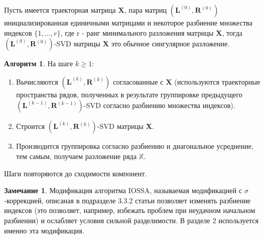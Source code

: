 \documentclass[specialist,
               substylefile = spbu_report.rtx,
               subf,href,colorlinks=true, 12pt]{disser}
\theoremstyle{definition}
\newtheorem{algorithm}{Алгоритм}
\newtheorem{remark}{Замечание}
\begin{document}
    Пусть имеется траекторная матрица $\mathbf{X}$, пара матриц $(\mathbf{L}^{(0)}, \mathbf{R}^{(0)})$ инициализированная единичными матрицами и некоторое разбиение множества индексов $\{ 1,...,r\}$, где r - ранг минимального разложения матрицы $\mathbf{X}$, тогда $(\mathbf{L}^{(0)}, \mathbf{R}^{(0)})$-SVD матрицы $\mathbf{X}$ это обычное сингулярное разложение.
    \begin{algorithm}
        На шаге $k \geq 1$:
        \begin{enumerate}
            \item Вычисляются $(\mathbf{L}^{(k)}, \mathbf{R}^{(k)})$ согласованные с $\mathbf{X}$ (используются траекторные пространства рядов, полученных в результате группировке предыдущего $(\mathbf{L}^{(k - 1)}, \mathbf{R}^{(k - 1)})$-SVD согласно разбиению множества индексов).
            \item Строится $(\mathbf{L}^{(k)}, \mathbf{R}^{(k)})$-SVD матрицы $\mathbf{X}$.
            \item Производится группировка согласно разбиению и диагональное усреднение, тем самым, получаем разложение ряда $\mathbb{X}$.
        \end{enumerate}
        Шаги повторяются до сходимости компонент.
    \end{algorithm}
    \begin{remark}
        Модификация алгоритма IOSSA, называемая модификацией с $\sigma$-коррекцией, описаная в подразделе 3.3.2 статьи \cite{Golyandina15} позволяет изменять разбиение индексов (это позволяет, например, избежать проблем при неудачном начальном разбиении) и ослабляет условия сильной разделимости. В разделе 2 используется именно эта модификация.
    \end{remark}
    
\end{document}

